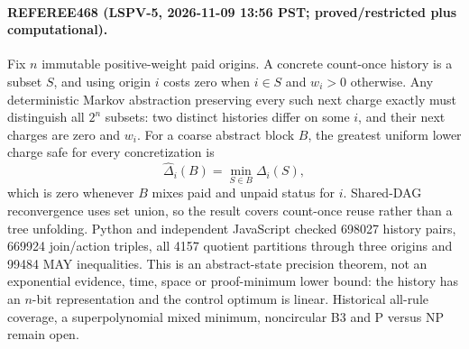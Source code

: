 \paragraph{REFEREE468 (LSPV-5, 2026-11-09 13:56 PST; proved/restricted plus computational).}
Fix $n$ immutable positive-weight paid origins.  A concrete count-once history
is a subset $S$, and using origin $i$ costs zero when $i\in S$ and $w_i>0$
otherwise.  Any deterministic Markov abstraction preserving every such next
charge exactly must distinguish all $2^n$ subsets: two distinct histories
differ on some $i$, and their next charges are zero and $w_i$.  For a coarse
abstract block $B$, the greatest uniform lower charge safe for every
concretization is
\[
 \widehat\Delta_i(B)=\min_{S\in B}\Delta_i(S),
\]
which is zero whenever $B$ mixes paid and unpaid status for $i$.  Shared-DAG
reconvergence uses set union, so the result covers count-once reuse rather than
a tree unfolding.  Python and independent JavaScript checked 698027 history
pairs, 669924 join/action triples, all 4157 quotient partitions through three
origins and 99484 MAY inequalities.  This is an abstract-state precision
theorem, not an exponential evidence, time, space or proof-minimum lower bound:
the history has an $n$-bit representation and the control optimum is linear.
Historical all-rule coverage, a superpolynomial mixed minimum, noncircular B3
and P versus NP remain open.
